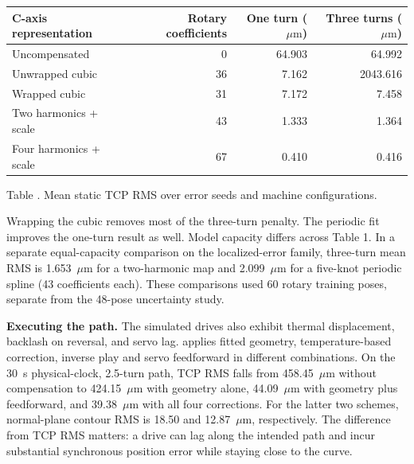 \documentclass[11pt,a4paper]{article}
\newcommand{\um}{\ensuremath{\mu\mathrm{m}}}
\newcommand{\file}[1]{\texttt{\detokenize{#1}}}
\begin{document}
\begin{center}
\begin{tabular}{@{}lrrr@{}}\toprule
C-axis representation & Rotary coefficients & One turn (\um) & Three turns (\um)\\\midrule
Uncompensated & 0 & 64.903 & 64.992\\
Unwrapped cubic & 36 & 7.162 & 2043.616\\
Wrapped cubic & 31 & 7.172 & 7.458\\
Two harmonics + scale & 43 & 1.333 & 1.364\\
Four harmonics + scale & 67 & 0.410 & 0.416\\\bottomrule
\end{tabular}\par\small {}Table \thetable. Mean static TCP RMS over error seeds and machine configurations.\end{center}
Wrapping the cubic removes most of the three-turn penalty. The periodic fit improves the one-turn result as well. Model capacity differs across Table 1. In a separate equal-capacity comparison on the localized-error family, three-turn mean RMS is 1.653~\um{} for a two-harmonic map and 2.099~\um{} for a five-knot periodic spline (43 coefficients each). These comparisons used 60 rotary training poses, separate from the 48-pose uncertainty study.
 
\textbf{Executing the path.} The simulated drives also exhibit thermal displacement, backlash on reversal, and servo lag. \file{dynamic_sim.py} applies fitted geometry, temperature-based correction, inverse play and servo feedforward in different combinations. On the 30~s physical-clock, 2.5-turn path, TCP RMS falls from 458.45~\um{} without compensation to 424.15~\um{} with geometry alone, 44.09~\um{} with geometry plus feedforward, and 39.38~\um{} with all four corrections. For the latter two schemes, normal-plane contour RMS is 18.50 and 12.87~\um{}, respectively. The difference from TCP RMS matters: a drive can lag along the intended path and incur substantial synchronous position error while staying close to the curve.
\newpage
\end{document}
